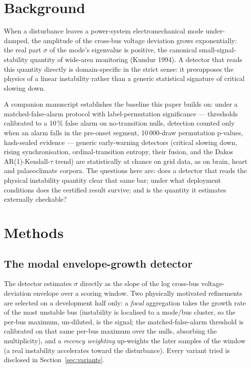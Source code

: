 \documentclass[11pt]{article}
\begin{document}
\section{Background}\label{sec:background}

When a disturbance leaves a power-system electromechanical mode
under-damped, the amplitude of the cross-bus voltage deviation grows
exponentially: the real part $\sigma$ of the mode's eigenvalue is
positive, the canonical small-signal-stability quantity of wide-area
monitoring (Kundur 1994). A detector that reads this quantity directly
is domain-specific in the strict sense: it presupposes the physics of a
linear instability rather than a generic statistical signature of
critical slowing down.

A companion manuscript establishes the baseline this paper builds on:
under a matched-false-alarm protocol with label-permutation
significance --- thresholds calibrated to a 10\,\% false alarm on
no-transition nulls, detection counted only when an alarm falls in the
pre-onset segment, 10\,000-draw permutation p-values, hash-sealed
evidence --- generic early-warning detectors (critical slowing down,
rising synchronisation, ordinal-transition entropy, their fusion, and
the Dakos AR(1)-Kendall-$\tau$ trend) are statistically at chance on
grid data, as on brain, heart and palaeoclimate corpora. The questions
here are: does a detector that reads the physical instability quantity
clear that same bar; under what deployment conditions does the
certified result survive; and is the quantity it estimates externally
checkable?

\section{Methods}\label{sec:methods}

\subsection{The modal envelope-growth detector}

The detector estimates $\sigma$ directly as the slope of the log
cross-bus voltage-deviation envelope over a scoring window. Two
physically motivated refinements are selected on a development half
only: a \emph{focal} aggregation takes the growth rate of the most
unstable bus (instability is localised to a mode/bus cluster, so the
per-bus maximum, un-diluted, is the signal; the matched-false-alarm
threshold is calibrated on that same per-bus maximum over the nulls,
absorbing the multiplicity), and a \emph{recency weighting} up-weights
the later samples of the window (a real instability accelerates toward
the disturbance). Every variant tried is disclosed in
Section~\ref{sec:variants}.
\end{document}
